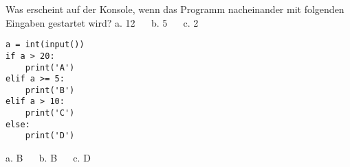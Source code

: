 \question[3] 
Was erscheint auf der Konsole, wenn das Programm nacheinander mit folgenden
Eingaben gestartet wird?
a. 12  ~~ b. 5  ~~ c. 2
\begin{lstlisting}
a = int(input())
if a > 20:
    print('A')
elif a >= 5:
    print('B')
elif a > 10:
    print('C')
else:
    print('D')
\end{lstlisting}
\begin{solutionbox}{1cm}
a. B ~~ b. B ~~ c. D
\end{solutionbox}
